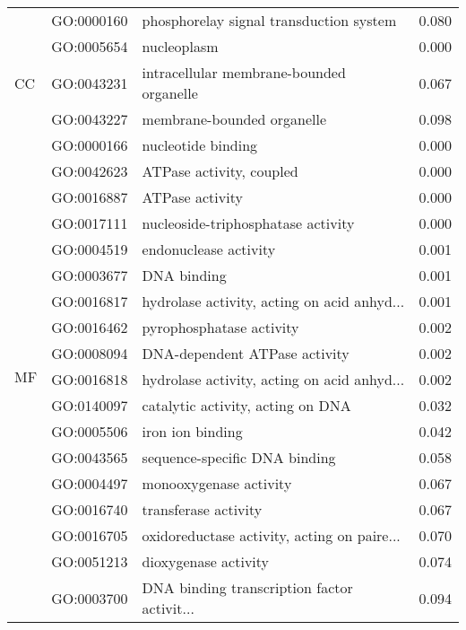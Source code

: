 \begin{longtable}{lllr}
   & GO:0000160 &      phosphorelay signal transduction system &         0.080 \\
\cline{1-4}
\multirow{3}{*}{CC} & GO:0005654 &                                  nucleoplasm &         0.000 \\
   & GO:0043231 &     intracellular membrane-bounded organelle &         0.067 \\
   & GO:0043227 &                   membrane-bounded organelle &         0.098 \\
\cline{1-4}
\multirow{18}{*}{MF} & GO:0000166 &                           nucleotide binding &         0.000 \\
   & GO:0042623 &                     ATPase activity, coupled &         0.000 \\
   & GO:0016887 &                              ATPase activity &         0.000 \\
   & GO:0017111 &           nucleoside-triphosphatase activity &         0.000 \\
   & GO:0004519 &                        endonuclease activity &         0.001 \\
   & GO:0003677 &                                  DNA binding &         0.001 \\
   & GO:0016817 &  hydrolase activity, acting on acid anhyd... &         0.001 \\
   & GO:0016462 &                     pyrophosphatase activity &         0.002 \\
   & GO:0008094 &                DNA-dependent ATPase activity &         0.002 \\
   & GO:0016818 &  hydrolase activity, acting on acid anhyd... &         0.002 \\
   & GO:0140097 &            catalytic activity, acting on DNA &         0.032 \\
   & GO:0005506 &                             iron ion binding &         0.042 \\
   & GO:0043565 &                sequence-specific DNA binding &         0.058 \\
   & GO:0004497 &                       monooxygenase activity &         0.067 \\
   & GO:0016740 &                         transferase activity &         0.067 \\
   & GO:0016705 &  oxidoreductase activity, acting on paire... &         0.070 \\
   & GO:0051213 &                         dioxygenase activity &         0.074 \\
   & GO:0003700 &  DNA binding transcription factor activit... &         0.094 \\
\end{longtable}
